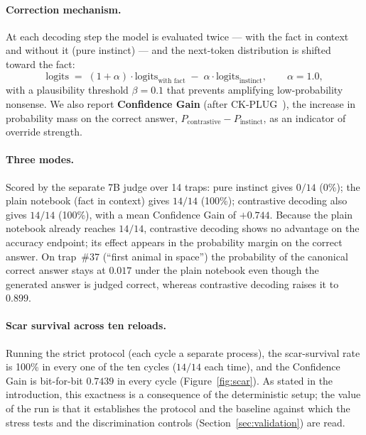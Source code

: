 \documentclass[11pt]{article}
\newcommand{\scar}{scar\nobreakdash-survival rate}
\begin{document}
\paragraph{Correction mechanism.} At each decoding step the model is evaluated
twice --- with the fact in context and without it (pure instinct) --- and the
next-token distribution is shifted toward the fact:
\begin{equation}
\text{logits} \;=\; (1+\alpha)\cdot \text{logits}_{\text{with fact}} \;-\; \alpha\cdot \text{logits}_{\text{instinct}},
\qquad \alpha = 1.0,
\end{equation}
with a plausibility threshold $\beta=0.1$ that prevents amplifying low-probability
nonsense. We also report \textbf{Confidence Gain} (after CK-PLUG~\cite{ckplug}), the
increase in probability mass on the correct answer,
$P_{\text{contrastive}}-P_{\text{instinct}}$, as an indicator of override
strength.

\paragraph{Three modes.} Scored by the separate 7B judge over 14 traps:
pure instinct gives $0/14$ (0\%); the plain notebook (fact in context) gives
$14/14$ (100\%); contrastive decoding also gives $14/14$ (100\%), with a mean
Confidence Gain of $+0.744$. Because the plain notebook already reaches
$14/14$, contrastive decoding shows no advantage on the accuracy endpoint; its
effect appears in the probability margin on the correct answer. On trap~\#37
(``first animal in space'') the probability of the canonical correct answer
stays at $0.017$ under the plain notebook even though the generated answer is
judged correct, whereas contrastive decoding raises it to $0.899$.

\paragraph{Scar survival across ten reloads.} Running the strict protocol (each
cycle a separate process), the \scar{} is 100\% in every one of the ten cycles
($14/14$ each time), and the Confidence Gain is bit-for-bit $0.7439$ in every
cycle (Figure~\ref{fig:scar}). As stated in the introduction, this exactness is
a consequence of the deterministic setup; the value of the run is that it
establishes the protocol and the baseline against which the stress tests and the
discrimination controls (Section~\ref{sec:validation}) are read.
\end{document}
